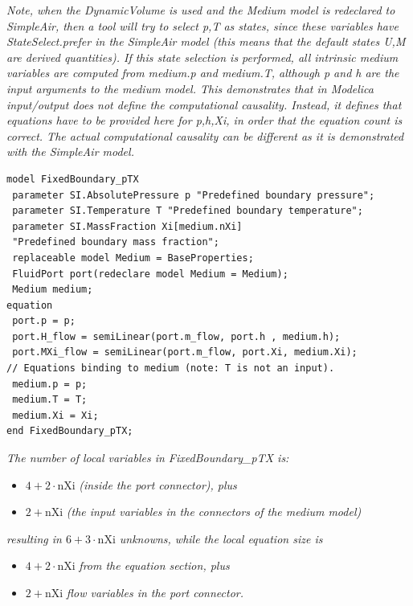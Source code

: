 \documentclass[10pt,a4paper]{report}
\def\Mcommentmid#1{\emph{#1}}
\begin{document}
\Mcommentmid{Note, when the \emph{DynamicVolume} is used and the \emph{Medium}
model is redeclared to \emph{SimpleAir}, then a tool will try
to select \emph{p},\emph{T} as states, since these variables have
\emph{StateSelect.prefer} in the \emph{SimpleAir} model (this means that
the default states \emph{U},\emph{M} are derived quantities). If this state
selection is performed, all intrinsic medium variables are computed
from \emph{medium.p} and \emph{medium.T}, although \emph{p} and \emph{h}
are the input arguments to the medium model. This demonstrates
that in Modelica input/output does not define the computational
causality. Instead, it defines that equations have to be provided here
for \emph{p},\emph{h},\emph{Xi}, in order that the equation count is correct. The
actual computational causality can be different as it is demonstrated
with the \emph{SimpleAir} model.}
\begin{lstlisting}[language=modelica]
model FixedBoundary_pTX
 parameter SI.AbsolutePressure p "Predefined boundary pressure";
 parameter SI.Temperature T "Predefined boundary temperature";
 parameter SI.MassFraction Xi[medium.nXi]
 "Predefined boundary mass fraction";
 replaceable model Medium = BaseProperties;
 FluidPort port(redeclare model Medium = Medium);
 Medium medium;
equation
 port.p = p;
 port.H_flow = semiLinear(port.m_flow, port.h , medium.h);
 port.MXi_flow = semiLinear(port.m_flow, port.Xi, medium.Xi);
// Equations binding to medium (note: T is not an input).
 medium.p = p;
 medium.T = T;
 medium.Xi = Xi;
end FixedBoundary_pTX;
\end{lstlisting}

\Mcommentmid{The number of local variables in \emph{FixedBoundary\_pTX} is:}

\begin{itemize}
\item
  $4+2\cdot\textrm{nXi}$ \Mcommentmid{(inside the \emph{port} connector), plus}
\item
  $2+\textrm{nXi}$ \Mcommentmid{(the input variables in the connectors of the \emph{medium}
  model)}
\end{itemize}

\Mcommentmid{resulting in $6+3\cdot\textrm{nXi}$ unknowns, while the local
equation size is}

\begin{itemize}
\item
  $4+2\cdot\textrm{nXi}$ \Mcommentmid{from the equation section, plus}
\item
  $2+\textrm{nXi}$ \Mcommentmid{flow variables in the port connector. }
\end{itemize}
\end{document}
